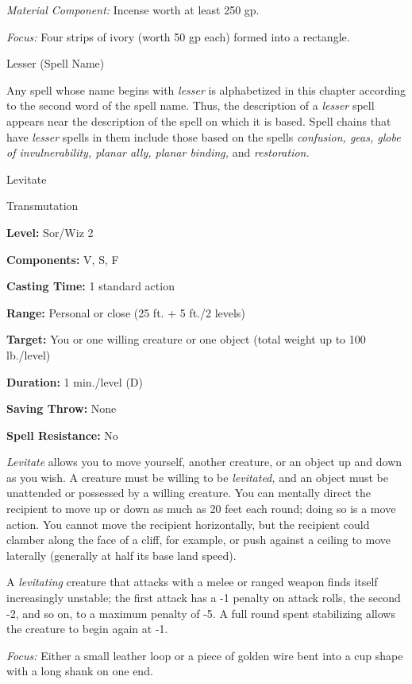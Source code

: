 \documentclass{article}
\begin{document}
\textit{Material Component: }Incense worth at least 250 gp.

\textit{Focus: }Four strips of ivory (worth 50 gp each) formed into a rectangle.

\vspace{12pt}
Lesser (Spell Name)

Any spell whose name begins with \textit{lesser }is alphabetized in this chapter 
according to the second word of the spell name. Thus, the description of a \textit{lesser 
}spell appears near the description of the spell on which it is based. Spell chains 
that have \textit{lesser }spells in them include those based on the spells \textit{confusion, 
geas, globe of invulnerability, planar ally, planar binding, }and \textit{restoration.}

\vspace{12pt}
Levitate

Transmutation

\textbf{Level:} Sor/Wiz 2

\textbf{Components:} V, S, F

\textbf{Casting Time:} 1 standard action

\textbf{Range:} Personal or close (25 ft. + 5 ft./2 levels)

\textbf{Target:} You or one willing creature or one object (total weight up to 
100 lb./level)

\textbf{Duration:} 1 min./level (D)

\textbf{Saving Throw:} None

\textbf{Spell Resistance:} No

\textit{Levitate }allows you to move yourself, another creature, or an object up 
and down as you wish. A creature must be willing to be \textit{levitated, }and 
an object must be unattended or possessed by a willing creature. You can mentally 
direct the recipient to move up or down as much as 20 feet each round; doing so 
is a move action. You cannot move the recipient horizontally, but the recipient 
could clamber along the face of a cliff, for example, or push against a ceiling 
to move laterally (generally at half its base land speed).

A \textit{levitating }creature that attacks with a melee or ranged weapon finds 
itself increasingly unstable; the first attack has a -1 penalty on attack rolls, 
the second -2, and so on, to a maximum penalty of -5. A full round spent stabilizing 
allows the creature to begin again at -1.

\textit{Focus: }Either a small leather loop or a piece of golden wire bent into 
a cup shape with a long shank on one end.
\end{document}
